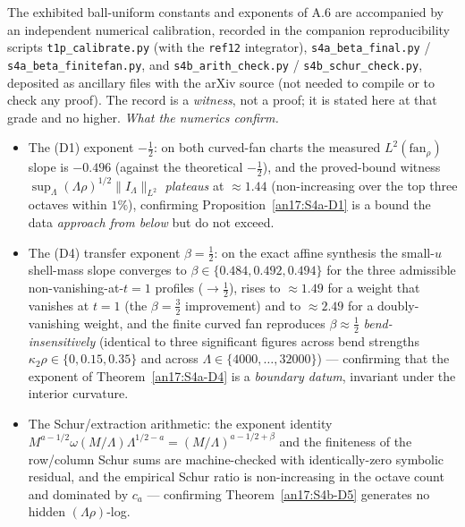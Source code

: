 \begin{remark}
\label{an17:cal-record}
The exhibited ball-uniform constants and exponents of A.6 are accompanied by an
independent numerical calibration, recorded in the companion reproducibility
scripts \texttt{t1p\_calibrate.py} (with the \texttt{ref12} integrator),
\texttt{s4a\_beta\_final.py} / \texttt{s4a\_beta\_finitefan.py}, and
\texttt{s4b\_arith\_check.py} / \texttt{s4b\_schur\_check.py}, deposited as
ancillary files with the arXiv source (not needed to compile or to check
any proof). The record is a
\emph{witness}, not a proof; it is stated here at that grade and no higher.
\emph{What the numerics confirm.}
\begin{itemize}
\item[\textup{(i)}] The (D1) exponent $-\tfrac12$: on both curved-fan charts the
 measured $L^2(\mathrm{fan}_\rho)$ slope is $-0.496$ (against the theoretical
 $-\tfrac12$), and the proved-bound witness
 $\sup_\Lambda(\Lambda\rho)^{1/2}\|I_\Lambda\|_{L^2}$ \emph{plateaus} at
 $\approx1.44$ (non-increasing over the top three octaves within $1\%$),
 confirming Proposition~\ref{an17:S4a-D1} is a bound the data \emph{approach from
 below} but do not exceed.
\item[\textup{(ii)}] The (D4) transfer exponent $\beta=\tfrac12$: on the exact
 affine synthesis the small-$u$ shell-mass slope converges to
 $\beta\in\{0.484,0.492,0.494\}$ for the three admissible non-vanishing-at-$t{=}1$
 profiles ($\to\tfrac12$), rises to $\approx1.49$ for a weight that vanishes at
 $t=1$ (the $\beta=\tfrac32$ improvement) and to $\approx2.49$ for a
 doubly-vanishing weight, and the finite curved fan reproduces
 $\beta\approx\tfrac12$ \emph{bend-insensitively} (identical to three significant
 figures across bend strengths $\kappa_2\rho\in\{0,0.15,0.35\}$ and across
 $\Lambda\in\{4000,\dots,32000\}$) --- confirming that the exponent of
 Theorem~\ref{an17:S4a-D4} is a \emph{boundary datum}, invariant under the
 interior curvature.
\item[\textup{(iii)}] The Schur/extraction arithmetic: the exponent identity
 $M^{a-1/2}\omega(M/\Lambda)\Lambda^{1/2-a}=(M/\Lambda)^{a-1/2+\beta}$ and the
 finiteness of the row/column Schur sums are machine-checked with identically-zero
 symbolic residual, and the empirical Schur ratio is non-increasing in the octave
 count and dominated by $c_a$ --- confirming Theorem~\ref{an17:S4b-D5} generates
 no hidden $(\Lambda\rho)$-log.
\end{itemize}

\end{remark}
